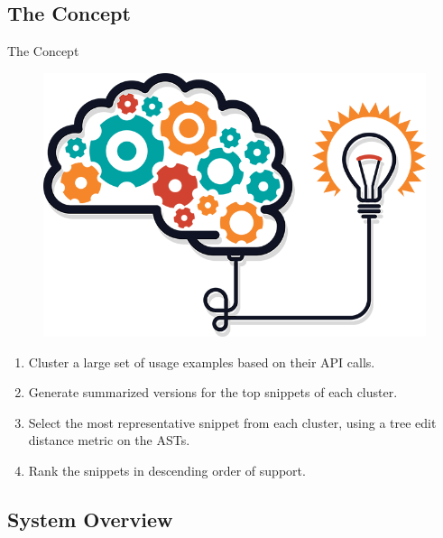 \documentclass[11pt]{beamer}
\begin{document}
\subsection{The Concept}
\begin{frame}{The Concept}{}
	\begin{figure}
		\includegraphics[scale=0.13]{TheConcept}
	\end{figure}
	\vspace{-25pt}
	\begin{block}{}{
			\begin{enumerate}
				\item
				      Cluster a large set of usage examples based on their API calls.
				\item Generate summarized versions for the top snippets of each cluster.
				\item Select the most representative snippet from each cluster, using a tree edit distance metric on the ASTs.
				\item Rank the snippets in descending order of support.
			\end{enumerate}}
	\end{block}
\end{frame}


\subsection{System Overview}
\end{document}
